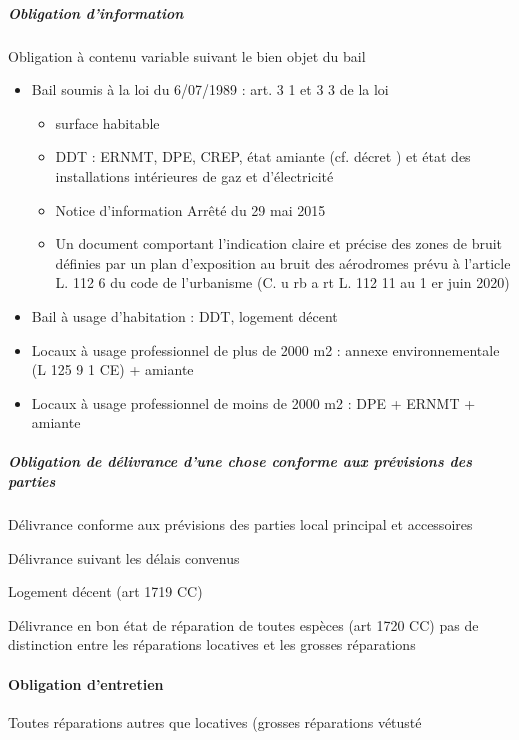 \documentclass[10pt,a4paper,twoside]{article}
\begin{document}
				\subparagraph{Obligation d’information}

					Obligation à contenu variable suivant le bien objet du bail
					\begin{itemize}
						\item Bail soumis à la loi du 6/07/1989 : art. 3 1 et 3 3 de la loi
							\begin{itemize}
								\item surface habitable

								\item DDT : ERNMT, DPE, CREP, état amiante (cf. décret ) et état des installations
								intérieures de gaz et d’électricité

								\item Notice d’information Arrêté du 29 mai 2015

								\item Un document comportant l’indication claire et précise des zones de bruit définies
								par un plan d’exposition au bruit des aérodromes prévu à l’article L. 112 6 du
								code de l’urbanisme (C. u rb a rt L. 112 11 au 1 er juin 2020)
							\end{itemize}

						\item Bail à usage d’habitation : DDT, logement décent

						\item Locaux à usage professionnel de plus de 2000 m2 : annexe environnementale (L
						125 9 1 CE) + amiante

						\item Locaux à usage professionnel de moins de 2000 m2 : DPE + ERNMT + amiante
					\end{itemize}

				\subparagraph{Obligation de délivrance d’une chose conforme aux prévisions des parties}

					Délivrance conforme aux prévisions des parties local
					principal et accessoires

					Délivrance suivant les délais convenus

					Logement décent (art 1719 CC)

					Délivrance en bon état de réparation de toutes
					espèces (art 1720 CC) pas de distinction entre les
					réparations locatives et les grosses réparations

			\paragraph{Obligation d’entretien}
				Toutes réparations autres que locatives (grosses réparations
				vétusté
\end{document}
